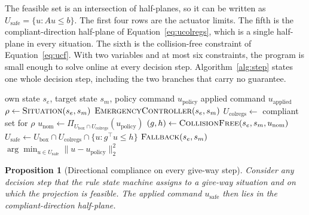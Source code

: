 \documentclass[10pt,letterpaper]{article}
\newtheorem{prop}{Proposition}
\newcommand{\capsize}{\fontsize{10}{12}\selectfont}
\begin{document}
The feasible set is an intersection of half-planes, so it can be written as $U_{\mathrm{safe}}=\{u:Au\le b\}$. The first four rows are the actuator limits. The fifth is the compliant-direction
half-plane
of Equation~\eqref{eq:ucolregs}, which is a single half-plane in every situation. The
sixth is the collision-free constraint of Equation~\eqref{eq:ucf}. With two variables and at most six constraints, the program is small enough to solve
online at every decision step. Algorithm~\ref{alg:step} states one whole decision step, including the two branches that carry no guarantee.

\begin{algorithm}[htbp]
\caption{One shielded decision step}
\label{alg:step}
\capsize
\begin{algorithmic}[1]
\Require own state $s_e$, target state $s_m$, policy command $u_{\mathrm{policy}}$
\Ensure applied command $u_{\mathrm{applied}}$
\State $\rho \gets \textproc{Situation}(s_e,s_m)$ 
 
  \State \Return $\textproc{EmergencyController}(s_e,s_m)$
\EndIf
\State $U_{\mathrm{colregs}} \gets$ compliant set for $\rho$ 
\State $u_{\mathrm{nom}} \gets \Pi_{U_{\mathrm{box}} \cap U_{\mathrm{colregs}}}(u_{\mathrm{policy}})$ 
\State $(g,h) \gets \textproc{CollisionFree}(s_e,s_m,u_{\mathrm{nom}})$ 
\State $U_{\mathrm{safe}} \gets U_{\mathrm{box}} \cap U_{\mathrm{colregs}} \cap \{u: g^{\!\top}u \le h\}$ 
 
  \State \Return $\textproc{Fallback}(s_e,s_m)$
\EndIf
\State \Return $\arg\min_{u \in U_{\mathrm{safe}}} \lVert u-u_{\mathrm{policy}}\rVert_2^2$ 
\end{algorithmic}
\end{algorithm}

\begin{prop}[Directional compliance on every give-way step]\label{prop:comply}
Consider any decision step that the rule state machine assigns to a give-way situation and
on which the projection is feasible. The applied command $u_{\mathrm{safe}}$ then lies in
the compliant-direction half-plane.
\end{prop}
\end{document}

